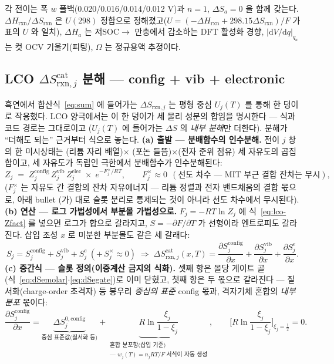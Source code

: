 \documentclass[11pt,a4paper]{article}
\newcommand{\dd}{\mathrm{d}}
\newcommand{\rxn}{\mathrm{rxn}}
\begin{document}
각 전이는 폭 $w$ 폴백(0.020/0.016/0.014/0.012 V)과 $n=1$, $\Delta S_a=0$ 을 함께 갖는다. $\Delta H_\rxn/\Delta S_\rxn$
은 $U(298)$ 정합으로 정해졌고($U=(-\Delta H_\rxn+298.15\Delta S_\rxn)/F$ 가 표의 $U$ 와 일치), $\Delta H_a$ 는 저SOC$\to$
만충에서 감소하는 DFT 활성화 경향, $|\dd V/\dd q|_{q_a}$ 는 컷 OCV 기울기(피팅), $\Omega$ 는 정규용액 추정이다.

\subsection{LCO $\Delta S_{\rxn,j}^\mathrm{cat}$ 분해 — config + vib + electronic}\label{sec:lco-decomp}
흑연에서 합산식~\eqref{eq:sum} 에 들어가는 $\Delta S_{\rxn,j}$ 는 평형 중심 $U_j(T)$ 를 통해 한 덩이로
작용했다. LCO 양극에서는 이 한 덩이가 세 물리 성분의 합임을 명시한다 — 식과 코드 경로는 그대로이고
($U_j(T)$ 에 들어가는 $\Delta S$ 의 \emph{내부 분해}만 더한다). 분해가 ``더해도 되는'' 근거부터 식으로
놓는다. \textbf{(a) 출발 — 분배함수의 인수분해.} 전이 $j$ 창의 한 미시상태는 (리튬 자리 배열)$\times$
(포논 들뜸)$\times$(전자 준위 점유) 세 자유도의 곱집합이고, 세 자유도가 독립인 극한에서 분배함수가
인수분해된다:
\begin{equation}
Z_j\;=\;Z_j^\mathrm{config}\,Z_j^\mathrm{vib}\,Z_j^\mathrm{elec}\;\times\;e^{-F_j^{\times}/RT},
\qquad F_j^{\times}\approx0\ \ (\text{선도 차수 — MIT 부근 결합 잔차는 무시}),
\label{eq:lco-Zfact}
\end{equation}
($F_j^{\times}$ 는 자유도 간 결합의 잔차 자유에너지 — 리튬 정렬과 전자 밴드채움의 결합 몫으로, 아래
bullet (가) 대로 슬롯 분리로 통제되는 것이 아니라 선도 차수에서 무시된다). \textbf{(b) 연산 — 로그
가법성에서 부분몰 가법성으로.} $F_j=-RT\ln Z_j$ 에 식~\eqref{eq:lco-Zfact} 를 넣으면 로그가 합으로
갈라지고, $S=-\partial F/\partial T$ 가 선형이라 엔트로피도 갈라진다. 삽입 조성 $x$ 로 미분한 부분몰도
같은 세 갈래다:
\begin{equation}
S_j=S_j^\mathrm{config}+S_j^\mathrm{vib}+S_j^{e}\ (+\,S_j^{\times}\!\approx\!0)
\;\Longrightarrow\;
\Delta S_{\rxn,j}^\mathrm{cat}(x,T)=\frac{\partial S_j^\mathrm{config}}{\partial x}
+\frac{\partial S_j^\mathrm{vib}}{\partial x}
+\frac{\partial S_j^{e}}{\partial x}.
\label{eq:lco-Sadd}
\end{equation}
\textbf{(c) 중간식 — 슬롯 정의(이중계산 금지의 식화).} 셋째 항은 몰당 게이트 골
(식~\eqref{eq:dSemolar}$\cdot$\eqref{eq:dSegate})로 이미 닫혔고, 첫째 항은 두 몫으로 갈라진다 —
질서화(charge-order 초격자) 등 봉우리 \emph{중심의 표준} config 몫과, 격자기체 혼합의 \emph{내부 분포}
몫이다:
\begin{equation}
\frac{\partial S_j^\mathrm{config}}{\partial x}
=\underbrace{\Delta S_j^{0,\mathrm{config}}}_{\text{중심 표준값(질서화 등)}}
+\underbrace{R\ln\frac{\xi_j}{1-\xi_j}}_{\substack{\text{혼합 분포항(삽입 기준)}\\ \text{— }w_j(T)=n_jRT/F\text{ 서식이 자동 생성}}},
\qquad
\Big[R\ln\frac{\xi_j}{1-\xi_j}\Big]_{\xi_j=\frac12}=0.
\label{eq:lco-configsplit}
\end{equation}
\end{document}
